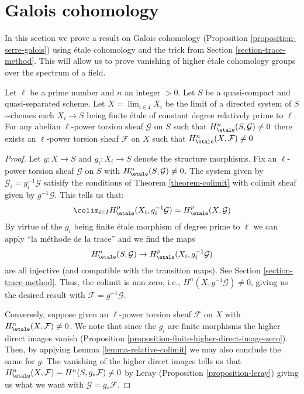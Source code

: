 \section{Galois cohomology}
\label{section-galois-cohomology}

\noindent
In this section we prove a result on Galois cohomology
(Proposition \ref{proposition-serre-galois})
using \'etale cohomology and the trick from
Section \ref{section-trace-method}.
This will allow us to prove vanishing of higher \'etale cohomology groups
over the spectrum of a field.

\begin{lemma}
\label{lemma-nonvanishing-inherited}
Let $\ell$ be a prime number and $n$ an integer $> 0$.
Let $S$ be a quasi-compact and quasi-separated scheme.
Let $X = \lim_{i \in I}{X_i}$ be the limit of a
directed system of $S$-schemes each $X_i \to S$
being finite \'etale of constant degree relatively prime to $\ell$.
For any abelian $\ell$-power torsion sheaf $\mathcal{G}$ on $S$
such that $H_\etale^n(S, \mathcal{G}) \neq 0$
there exists an $\ell$-power torsion sheaf $\mathcal{F}$ on $X$
such that $H_\etale^n(X, \mathcal{F}) \neq 0$
\end{lemma}

\begin{proof}
Let $g : X \to S$ and $g_i : X_i \to S$ denote the structure morphisms.
Fix an $\ell$-power torsion sheaf $\mathcal{G}$ on $S$
with $H^n_\etale(S, \mathcal{G}) \not = 0$.
The system given by $\mathcal{G}_i = g_i^{-1}\mathcal{G}$
satisify the conditions of Theorem \ref{theorem-colimit}
with colimit sheaf given by $g^{-1}\mathcal{G}$. This tells 
us that:
$$
\colim_{i\in I} H^p_\etale(X_i, g_i^{-1}\mathcal{G}) = 
H^p_\etale(X, \mathcal{G})
$$
By virtue of the $g_i$ being finite \'etale morphism of degree prime
to $\ell$ we can apply ``la m\'ethode de la trace'' and we find
the maps
$$
H^n_\etale(S, \mathcal{G}) \to H^p_\etale(X_i, g_i^{-1}\mathcal{G})
$$
are all injective (and compatible with the transition maps).
See Section \ref{section-trace-method}. Thus, the colimit is non-zero, i.e.,
$H^n(X,g^{-1}\mathcal{G}) \neq 0$, giving us the desired result with 
$\mathcal{F} = g^{-1}\mathcal{G}$.

\medskip\noindent
Conversely, suppose given an $\ell$-power torsion sheaf $\mathcal{F}$ on $X$
with $H^n_\etale(X, \mathcal{F}) \not = 0$. We note that since the $g_i$
are finite morphisms the higher direct images vanish
(Proposition \ref{proposition-finite-higher-direct-image-zero}).
Then, by applying Lemma \ref{lemma-relative-colimit}
we may also conclude the  same for $g$.
The vanishing of the higher direct images tells us that
$H^n_\etale(X, \mathcal{F}) = H^n(S, g_*\mathcal{F}) \neq 0$
by Leray (Proposition \ref{proposition-leray})
giving us what we want with $\mathcal{G} = g_*\mathcal{F}$.
\end{proof}

